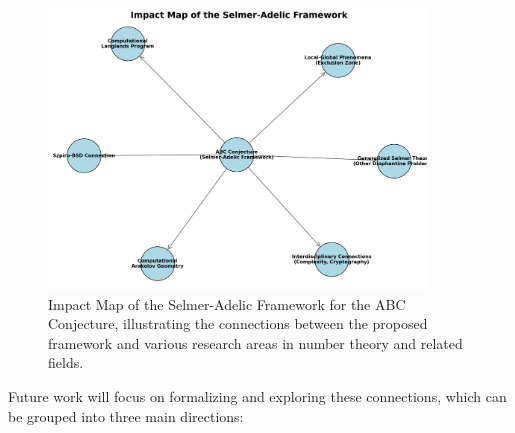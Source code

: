 \documentclass[11pt,a4paper]{article}
\begin{document}
\begin{figure}[h!]
    \centering
    \includegraphics[width=0.9\textwidth]{../figures/impact_map.png}
    \caption{Impact Map of the Selmer-Adelic Framework for the ABC Conjecture, illustrating the connections between the proposed framework and various research areas in number theory and related fields.}
    \label{fig:impact_map}
\end{figure}

Future work will focus on formalizing and exploring these connections, which can be grouped into three main directions:
\end{document}
